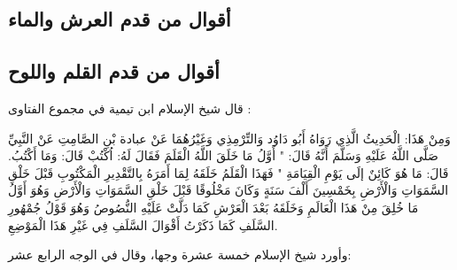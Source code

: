 \subsection{أقوال من قدم العرش والماء}

\subsection{أقوال من قدم القلم واللوح}

قال شيخ الإسلام ابن تيمية في مجموع الفتاوى \href{https://shamela.ws/book/7289/9349#p1}{\faExternalLink}:

وَمِنْ هَذَا: الْحَدِيثُ الَّذِي رَوَاهُ أَبُو دَاوُد وَالتِّرْمِذِي وَغَيْرُهُمَا عَنْ عبادة بْنِ الصَّامِتِ عَنْ النَّبِيِّ صَلَّى اللَّهُ عَلَيْهِ وَسَلَّمَ أَنَّهُ قَالَ: " {أَوَّلُ مَا خَلَقَ اللَّهُ الْقَلَمَ فَقَالَ لَهُ: اُكْتُبْ قَالَ: وَمَا أَكْتُبُ. قَالَ: مَا هُوَ كَائِنٌ إلَى يَوْمِ الْقِيَامَةِ} " فَهَذَا الْقَلَمُ خَلَقَهُ لِمَا أَمَرَهُ بِالتَّقْدِيرِ الْمَكْتُوبِ قَبْلَ خَلْقِ السَّمَوَاتِ وَالْأَرْضِ بِخَمْسِينَ أَلْفَ سَنَةٍ وَكَانَ مَخْلُوقًا قَبْلَ خَلْقِ السَّمَوَاتِ وَالْأَرْضِ وَهُوَ أَوَّلُ مَا خُلِقَ مِنْ هَذَا الْعَالَمِ وَخَلَقَهُ بَعْدَ الْعَرْشِ كَمَا دَلَّتْ عَلَيْهِ النُّصُوصُ وَهُوَ قَوْلُ جُمْهُورِ السَّلَفِ كَمَا ذَكَرْتُ أَقْوَالَ السَّلَفِ فِي غَيْرِ هَذَا الْمَوْضِعِ.

وأورد شيخ الإسلام خمسة عشرة وجها، وقال في الوجه الرابع عشر: 

